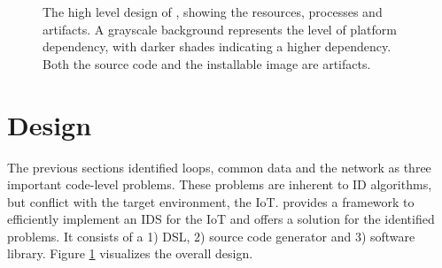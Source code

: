 \documentclass[3p,times,procedia]{elsarticle}
\begin{document}
\begin{figure}[b]
  \centering
\caption{The high level design of \NAME, showing the resources, processes and
artifacts. A grayscale background represents the level of platform dependency,
with darker shades indicating a higher dependency. Both the source code and the
installable image are artifacts.}

\label{fig:design}
\end{figure}

\section{Design}
\label{design}

The previous sections identified loops, common data and the network as three
important code-level problems. These problems are inherent to ID algorithms,
but conflict with the target environment, the IoT\@. \NAME provides a framework
to efficiently implement an IDS for the IoT and offers a solution for the
identified problems. It consists of a 1) DSL, 2) source code generator and 3)
software library. Figure \ref{fig:design} visualizes the overall design.

\end{document}
